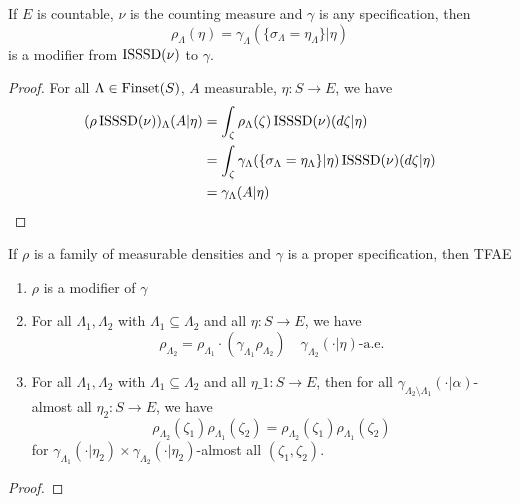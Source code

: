 \begin{lemma}
    \label{lem:exists-modif-isssd}

    If $E$ is countable, $\nu$ is the counting measure and $\gamma$ is any specification, then
    $$\rho_\Lambda(\eta) = \gamma_\Lambda(\{\sigma_\Lambda = \eta_\Lambda\} | \eta)$$
    is a modifier from $\operatorname{ISSSD}(\nu)$ to $\gamma$.
\end{lemma}
\begin{proof}

    For all $\Lambda \in \operatorname{Finset}(S)$, $A$ measurable, $\eta : S \to E$, we have
    \begin{align}
        (\rho\operatorname{ISSSD}(\nu))_\Lambda(A|\eta)
        & = \int_\zeta \rho_\Lambda(\zeta) \operatorname{ISSSD}(\nu)(d\zeta|\eta) \\
        & = \int_\zeta \gamma_\Lambda(\{\sigma_\Lambda = \eta_\Lambda\} | \eta) \operatorname{ISSSD}(\nu)(d\zeta|\eta) \\
        & = \gamma_\Lambda(A|\eta)
    \end{align}
\end{proof}

\begin{proposition}
    \label{prop:modif-tfae}
    \leanok{}

    If $\rho$ is a family of measurable densities and $\gamma$ is a proper specification, then TFAE
    \begin{enumerate}
        \item $\rho$ is a modifier of $\gamma$
        \item For all $\Lambda_1, \Lambda_2$ with $\Lambda_1 \subseteq \Lambda_2$ and all $\eta : S \to E$, we have
        $$\rho_{\Lambda_2} = \rho_{\Lambda_1}\cdot (\gamma_{\Lambda_1} \rho_{\Lambda_2}) \quad \gamma_{\Lambda_2}(\cdot|\eta)\text{-a.e.}$$
        \item For all $\Lambda_1, \Lambda_2$ with $\Lambda_1 \subseteq \Lambda_2$ and all $\eta\_1 : S \to E$, then for all $\gamma_{\Lambda_2 \setminus \Lambda_1}(\cdot|\alpha)$-almost all $\eta_2 : S \to E$, we have
        $$\rho_{\Lambda_2}(\zeta_1)\rho_{\Lambda_1}(\zeta_2) = \rho_{\Lambda_2}(\zeta_1) \rho_{\Lambda_1}(\zeta_2)$$
        for $\gamma_{\Lambda_1}(\cdot|\eta_2) \times \gamma_{\Lambda_2}(\cdot|\eta_2)$-almost all $(\zeta_1, \zeta_2)$.
    \end{enumerate}
\end{proposition}
\begin{proof}


\end{proof}

